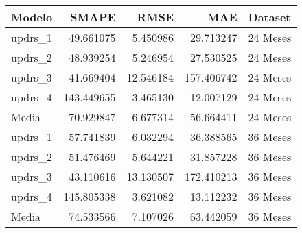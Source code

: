 \begin{tabular}{lrrrl}
\toprule
Modelo & SMAPE & RMSE & MAE & Dataset \\
\midrule
updrs_1 & 49.661075 & 5.450986 & 29.713247 & 24 Meses \\
updrs_2 & 48.939254 & 5.246954 & 27.530525 & 24 Meses \\
updrs_3 & 41.669404 & 12.546184 & 157.406742 & 24 Meses \\
updrs_4 & 143.449655 & 3.465130 & 12.007129 & 24 Meses \\
Media & 70.929847 & 6.677314 & 56.664411 & 24 Meses \\
updrs_1 & 57.741839 & 6.032294 & 36.388565 & 36 Meses \\
updrs_2 & 51.476469 & 5.644221 & 31.857228 & 36 Meses \\
updrs_3 & 43.110616 & 13.130507 & 172.410213 & 36 Meses \\
updrs_4 & 145.805338 & 3.621082 & 13.112232 & 36 Meses \\
Media & 74.533566 & 7.107026 & 63.442059 & 36 Meses \\
\bottomrule
\end{tabular}
